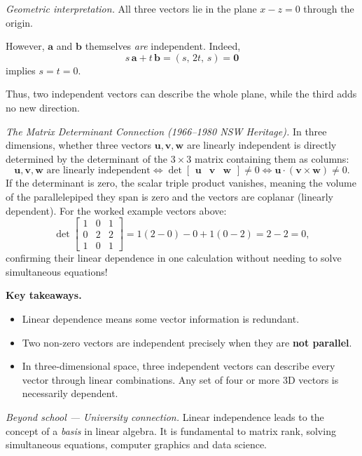\vspace{0.4em}
\noindent\textit{Geometric interpretation.}
All three vectors lie in the plane $x - z = 0$ through the origin.

However, $\mathbf{a}$ and $\mathbf{b}$ themselves \emph{are}
independent. Indeed,
\[
  s\,\mathbf{a} + t\,\mathbf{b}
  = (s,\, 2t,\, s) = \mathbf{0}
\]
implies $s = t = 0$.

Thus, two independent vectors can describe the whole plane, while
the third adds no new direction.

\vspace{0.4em}
\noindent\textit{The Matrix Determinant Connection (1966--1980 NSW Heritage).}
In three dimensions, whether three vectors $\mathbf{u}, \mathbf{v}, \mathbf{w}$ are linearly independent is directly determined by the determinant of the $3 \times 3$ matrix containing them as columns:
\[
\mathbf{u}, \mathbf{v}, \mathbf{w} \text{ are linearly independent} \iff \det \begin{bmatrix} \mathbf{u} & \mathbf{v} & \mathbf{w} \end{bmatrix} \neq 0 \iff \mathbf{u} \cdot (\mathbf{v} \times \mathbf{w}) \neq 0.
\]
If the determinant is zero, the scalar triple product vanishes, meaning the volume of the parallelepiped they span is zero and the vectors are coplanar (linearly dependent). For the worked example vectors above:
\[
\det \begin{bmatrix} 1 & 0 & 1 \\ 0 & 2 & 2 \\ 1 & 0 & 1 \end{bmatrix} = 1(2 - 0) - 0 + 1(0 - 2) = 2 - 2 = 0,
\]
confirming their linear dependence in one calculation without needing to solve simultaneous equations!

\vspace{0.8em}
\noindent\textbf{Key takeaways.}
\begin{itemize}[leftmargin=*,itemsep=2pt]
  \item Linear dependence means some vector information is redundant.
  \item Two non-zero vectors are independent precisely when they are
        \textbf{not parallel}.
  \item In three-dimensional space, three independent vectors can
        describe every vector through linear combinations.
        Any set of four or more 3D vectors is necessarily dependent.
\end{itemize}

\vspace{0.4em}
\noindent\textit{Beyond school --- University connection.}
Linear independence leads to the concept of a \emph{basis} in linear
algebra. It is fundamental to matrix rank, solving simultaneous
equations, computer graphics and data science.

\endgroup
